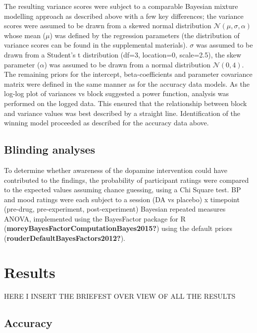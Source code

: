 \documentclass{article}
\begin{document}
The resulting variance scores were subject to a comparable Bayesian
mixture modelling approach as described above with a few key
differences; the variance scores were assumed to be drawn from a skewed
normal distribution \(\mathcal{N}(\mu, \sigma, \alpha)\) whose mean
(\(\mu\)) was defined by the regression parameters (the distribution of
variance scores can be found in the supplemental materials). \(\sigma\)
was assumed to be drawn from a Student's t distribution (df=3,
location=0, scale=2.5), the skew parameter (\(\alpha\)) was assumed to
be drawn from a normal distribution \(\mathcal{N}(0,4)\). The remaining
priors for the intercept, beta-coefficients and parameter covariance
matrix were defined in the same manner as for the accuracy data models.
As the log-log plot of variances vs block suggested a power function,
analysis was performed on the logged data. This ensured that the
relationship between block and variance values was best described by a
straight line. Identification of the winning model proceeded as
described for the accuracy data above.

\hypertarget{blinding-analyses}{%
\subsection{Blinding analyses}\label{blinding-analyses}}

To determine whether awareness of the dopamine intervention could have
contributed to the findings, the probability of participant ratings were
compared to the expected values assuming chance guessing, using a Chi
Square test. BP and mood ratings were each subject to a session (DA vs
placebo) x timepoint (pre-drug, pre-experiment, post-experiment)
Bayesian repeated measures ANOVA, implemented using the BayesFactor
package for R (\textbf{moreyBayesFactorComputationBayes2015?}) using the
default priors (\textbf{rouderDefaultBayesFactors2012?}).

\hypertarget{results}{%
\section{Results}\label{results}}

HERE I INSERT THE BRIEFEST OVER VIEW OF ALL THE RESULTS

\hypertarget{accuracy-1}{%
\subsection{Accuracy}\label{accuracy-1}}
\end{document}
